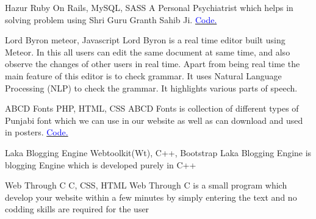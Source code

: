     {Hazur}
    {}
    {\scriptsize Ruby On Rails, MySQL, SASS}
    {}
    {
       A Personal Psychiatrist which helps in solving problem using Shri Guru Granth Sahib Ji. 
        \hfill
        \href{http://github.com/amitojsingh/Hazur}{\textcolor{blue}{\scriptsize Code.}}
    }
    \vspace*{0.2\baselineskip}

    {Lord Byron}
    {}
    {\scriptsize meteor, Javascript}
    {}
    {
        Lord Byron is a real time editor built using Meteor.
        In this all users can edit the same document at same time, and also observe the changes of other users in real time.
        Apart from being real time the main feature of this editor is to check grammar. It uses Natural Language Processing (NLP) to check the grammar. It highlights various parts of speech.
    }
    \vspace*{0.2\baselineskip}

    {ABCD Fonts}
    {}
    {\scriptsize PHP, HTML, CSS}
    {}
    {
        ABCD Fonts is collection of different types of Punjabi font which we can use in our website as well as can download and used in posters.
        \hfill
        \href{https://github.com/amitojsingh/ABCD-fonts}{\textcolor{blue}{\scriptsize Code.}}
    }
    \vspace*{0.2\baselineskip}
    
    {Laka Blogging Engine}
    {}
    {\scriptsize Webtoolkit(Wt), C++, Bootstrap}
    {}
    {Laka Blogging Engine is blogging Engine which is developed purely in C++}

{Web Through C}
{}
{\scriptsize C, CSS, HTML}
{}
{Web Through C is a small program which develop your website within a few minutes by simply entering the text and no codding skills are required for the user }